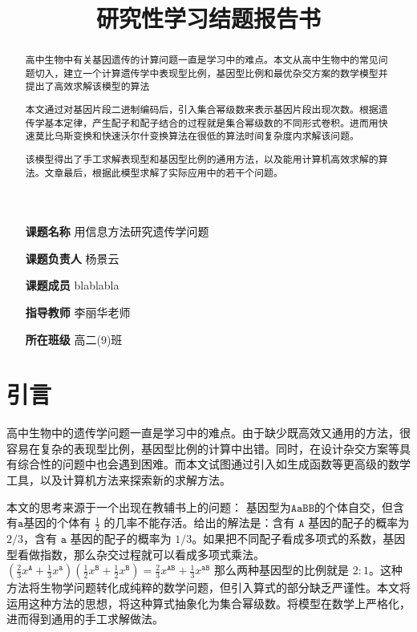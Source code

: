 \documentclass{article}
\title{研究性学习结题报告书}
\author{}
\begin{document}
\maketitle

\begin{itemize}
    \item[\textbf{课题名称}] 用信息方法研究遗传学问题 \centering
    \item[\textbf{课题负责人}] 杨景云
    \item[\textbf{课题成员}] blablabla
    \item[\textbf{指导教师}] 李丽华老师
    \item[\textbf{所在班级}] 高二(9)班
\end{itemize}

\begin{abstract}
    高中生物中有关基因遗传的计算问题一直是学习中的难点。本文从高中生物中的常见问题切入，建立一个计算遗传学中表现型比例，基因型比例和最优杂交方案的数学模型并提出了高效求解该模型的算法
    
    本文通过对基因片段二进制编码后，引入集合幂级数来表示基因片段出现次数。根据遗传学基本定律，产生配子和配子结合的过程就是集合幂级数的不同形式卷积。进而用快速莫比乌斯变换和快速沃尔什变换算法在很低的算法时间复杂度内求解该问题。
    
    该模型得出了手工求解表现型和基因型比例的通用方法，以及能用计算机高效求解的算法。文章最后，根据此模型求解了实际应用中的若干个问题。
\end{abstract}

\newpage

\tableofcontents %

\newpage

\section{引言}

高中生物中的遗传学问题一直是学习中的难点。由于缺少既高效又通用的方法，很容易在复杂的表现型比例，基因型比例的计算中出错。同时，在设计杂交方案等具有综合性的问题中也会遇到困难。而本文试图通过引入如生成函数等更高级的数学工具，以及计算机方法来探索新的求解方法。

本文的思考来源于一个出现在教辅书上的问题： 基因型为$\texttt{AaBB}$的个体自交，但含有$\texttt{a}$基因的个体有 $\frac{1}{2} $ 的几率不能存活。给出的解法是：含有 $\texttt{A}$ 基因的配子的概率为 $2/3$，含有 $\texttt{a}$ 基因的配子的概率为 $1/3$。如果把不同配子看成多项式的系数，基因型看做指数，那么杂交过程就可以看成多项式乘法。 
$(\frac{2}{3}x^{\texttt{A}}+\frac{1}{3} x^{\texttt{a}})(\frac{1}{2}x^{\texttt{B}}+\frac{1}{2}x^{\texttt{B}})=\frac{2}{3}x^{\texttt{AB}}+\frac{1}{3}x^{\texttt{aB}}$ 那么两种基因型的比例就是 $2:1$。这种方法将生物学问题转化成纯粹的数学问题，但引入算式的部分缺乏严谨性。本文将运用这种方法的思想，将这种算式抽象化为集合幂级数。将模型在数学上严格化，进而得到通用的手工求解做法。
\end{document}
